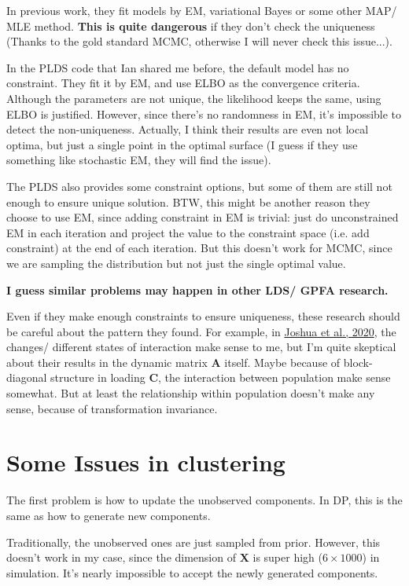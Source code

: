 \documentclass[]{article}
\begin{document}
In previous work, they fit models by EM, variational Bayes or some other MAP/ MLE method. \textbf{This is quite dangerous} if they don't check the uniqueness (Thanks to the gold standard MCMC, otherwise I will never check this issue...). 

In the PLDS code that Ian shared me before, the default model has no constraint. They fit it by EM, and use ELBO as the convergence criteria. Although the parameters are not unique, the likelihood keeps the same, using ELBO is justified. However, since there's no randomness in EM, it's impossible to detect the non-uniqueness. Actually, I think their results are even not local optima, but just a single point in the optimal surface (I guess if they use something like stochastic EM, they will find the issue).  

The PLDS also provides some constraint options, but some of them are still not enough to ensure unique solution. BTW, this might be another reason they choose to use EM, since adding constraint in EM is trivial: just do unconstrained EM in each iteration and project the value to the constraint space (i.e. add constraint) at the end of each iteration. But this doesn't work for MCMC, since we are sampling the distribution but not just the single optimal value.

\textbf{I guess similar problems may happen in other LDS/ GPFA research.}

Even if they make enough constraints to ensure uniqueness, these research should be careful about the pattern they found. For example, in \href{https://papers.nips.cc/paper/2020/hash/aa1f5f73327ba40d47ebce155e785aaf-Abstract.html}{Joshua et al., 2020}, the changes/ different states of interaction make sense to me, but I'm quite skeptical about their results in the dynamic matrix $\mathbf{A}$ itself. Maybe because of block-diagonal structure in loading $\mathbf{C}$, the interaction between population make sense somewhat. But at least the relationship within population doesn't make any sense, because of transformation invariance.

\section{Some Issues in clustering}
The first problem is how to update the unobserved components. In DP, this is the same as how to generate new components.

Traditionally, the unobserved ones are just sampled from prior. However, this doesn't work in my case, since the dimension of $\bm{X}$ is super high ($6\times 1000$) in simulation. It's nearly impossible to accept the newly generated components.
\end{document}
